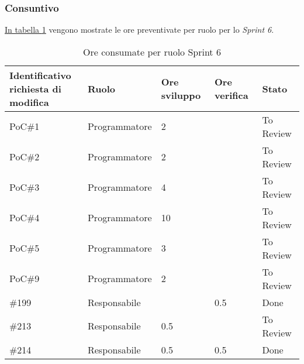 \subsubsection{Consuntivo}
\hyperref[tab:sprint6_ore_consumate]{In tabella \ref{tab:sprint6_ore_consumate}} vengono mostrate le ore preventivate per ruolo per lo \textit{Sprint 6}.

\begin{table}[H]
    \centering
    \begin{tabular}{| l | l | l | l | l |}
        \hline
            \makecell{\textbf{Identificativo} \\ \textbf{richiesta di modifica}} &
            \textbf{Ruolo} & 
            \textbf{Ore sviluppo} &
            \textbf{Ore verifica} & 
            \textbf{Stato}\\ 
        \hline
        PoC\#1 & Programmatore & 2 &  & To Review\\
        \hline
        PoC\#2 & Programmatore & 2 &  & To Review\\
        \hline
        PoC\#3 & Programmatore & 4 &  & To Review\\
        \hline
        PoC\#4 & Programmatore & 10 &  & To Review\\
        \hline
        PoC\#5 & Programmatore & 3 &  & To Review\\
        \hline
        PoC\#9 & Programmatore & 2 &  & To Review\\
        \hline
        \#199 & Responsabile &  & 0.5 & Done\\
        \hline
        \#213 & Responsabile & 0.5 &  & To Review\\
        \hline
        \#214 & Responsabile & 0.5 & 0.5 & Done\\
        \hline
    \end{tabular}
    \caption{Ore consumate per ruolo Sprint 6}
    \label{tab:sprint6_ore_consumate} 
\end{table}